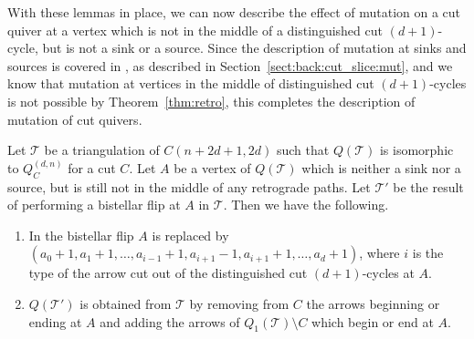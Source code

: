 \documentclass[ALCO,Unicode,published]{cedram}
\newcommand{\qdn}{Q^{(d, n)}}
\begin{document}
With these lemmas in place, we can now describe the effect of mutation on a cut quiver at a vertex which is not in the middle of a distinguished cut $(d + 1)$-cycle, but is not a sink or a source. Since the description of mutation at sinks and sources is covered in \cite{io}, as described in Section~\ref{sect:back:cut_slice:mut}, and we know that mutation at vertices in the middle of distinguished cut $(d + 1)$-cycles is not possible by Theorem~\ref{thm:retro}, this completes the description of mutation of cut quivers.

\begin{prop}\label{prop:comp_cut_mut}
Let $\mathcal{T}$ be a triangulation of $C(n + 2d + 1, 2d)$ such that $Q(\mathcal{T})$ is isomorphic to $\qdn_{C}$ for a cut $C$. Let $A$ be a vertex of $Q(\mathcal{T})$ which is neither a sink nor a source, but is still not in the middle of any retrograde paths. Let $\mathcal{T}'$ be the result of performing a bistellar flip at $A$ in $\mathcal{T}$. Then we have the following.
\begin{enumerate}
\item In the bistellar flip $A$ is replaced by $(a_{0} + 1, a_{1} + 1, \dots, a_{i - 1} + 1, a_{i + 1} - 1, a_{i + 1} + 1, \dots, a_{d} + 1)$, where $i$ is the type of the arrow cut out of the distinguished cut $(d + 1)$-cycles at $A$.\label{op:flip_result}
\item $Q(\mathcal{T}')$ is obtained from $\mathcal{T}$ by removing from $C$ the arrows beginning or ending at $A$ and adding the arrows of $Q_{1}(\mathcal{T})\setminus C$ which begin or end at $A$.\label{op:quiv_mut}
\end{enumerate}
\end{prop}
\end{document}
